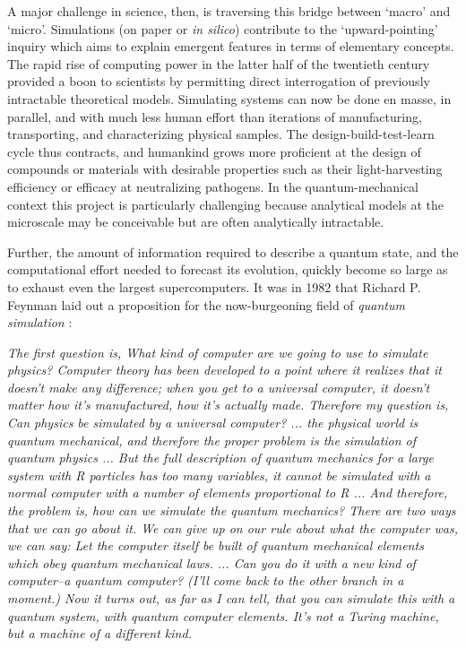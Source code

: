 	A major challenge in science, then, is traversing this bridge between `macro' and `micro'.
	Simulations (on paper or \emph{in silico}) contribute to the `upward-pointing' inquiry which aims to explain emergent features in terms of elementary concepts.
	The rapid rise of computing power in the latter half of the twentieth century provided a boon to scientists by permitting direct interrogation of previously intractable theoretical models.
	Simulating systems can now be done en masse, in parallel, and with much less human effort than iterations of manufacturing, transporting, and characterizing physical samples.
	The design-build-test-learn cycle thus contracts, and humankind grows more proficient at the design of compounds or materials with desirable properties such as their light-harvesting efficiency or efficacy at neutralizing pathogens.
	In the quantum-mechanical context this project is particularly challenging because analytical models at the microscale may be conceivable but are often analytically intractable.
	
	Further, the amount of information required to describe a quantum state, and the computational effort needed to forecast its evolution, quickly become so large as to exhaust even the largest supercomputers.
	It was in 1982 that Richard P.	Feynman laid out a proposition for the now-burgeoning field of \emph{quantum simulation} \cite{Feynman82}:

	\bigskip

	\begin{flushright}
	\singlespacing
	\emph{The first question is, What kind of computer are we going to use to simulate physics? Computer theory has been developed to a point where it realizes that it doesn't make any difference; when you get to a universal computer, it doesn't matter how it's manufactured, how it's actually made. Therefore my question is, Can physics be simulated by a universal computer? ... the physical world is quantum mechanical, and therefore the proper problem is the simulation of quantum physics ... But the full description of quantum mechanics for a large system with R particles  has too many variables, it cannot be simulated with a normal computer with a number of elements proportional to R ... And therefore, the problem is, how can we simulate the quantum mechanics? There are two ways that we can go about it. We can give up on our rule about what the computer was, we can say: Let the computer itself be built of quantum mechanical elements which obey quantum mechanical laws.  ... Can you do it with a new kind of computer--a quantum computer? (I'll come back to the other branch in a moment.) Now it turns out, as far as I can tell, that you can simulate this with a quantum system, with quantum computer elements. It's not a Turing machine, but a machine of a different kind.}
	\end{flushright}
	\bigskip

